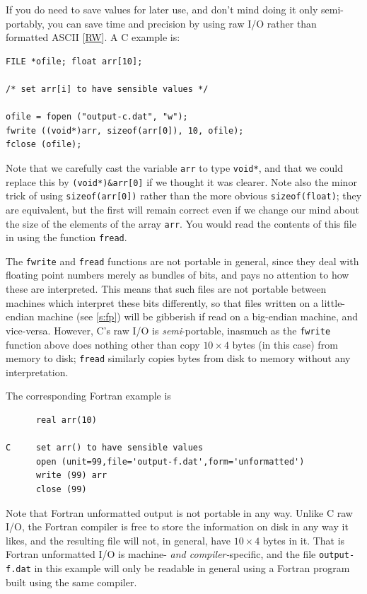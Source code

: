 \documentclass[11pt,oneside,chapters]{starlink}
\begin{document}
If you do need to save values for later use, and don't
mind doing it only semi-portably, you can save time and
precision by using raw I/O rather than formatted ASCII
[\hyperlink{ta:rw}{RW}].
A C example is:

\begin{verbatim}
FILE *ofile; float arr[10];

/* set arr[i] to have sensible values */

ofile = fopen ("output-c.dat", "w");
fwrite ((void*)arr, sizeof(arr[0]), 10, ofile);
fclose (ofile);
\end{verbatim}

Note that we carefully cast the variable
\texttt{arr} to type \texttt{void*}, and that we
could replace this by \texttt{(void*)\&arr[0]} if
we thought it was clearer.  Note also the minor trick of
using \texttt{sizeof(arr[0])} rather than the more
obvious \texttt{sizeof(float)}; they are equivalent,
but the first will remain correct even if we change our
mind about the size of the elements of the array
\texttt{arr}.  You would read the contents of this
file in using the function \texttt{fread}.

The \texttt{fwrite} and \texttt{fread}
functions are not portable in general, since they deal
with floating point numbers merely as bundles of bits,
and pays no attention to how these are interpreted.
This means that such files are not portable between
machines which interpret these bits differently, so that
files written on a little-endian machine (see \ref{s:fp})
will be gibberish if read on a big-endian
machine, and vice-versa.  However, C's raw I/O is
\emph{semi}-portable, inasmuch as the
\texttt{fwrite} function above does nothing other
than copy $10\times4$ bytes
(in this case) from memory to disk; \texttt{fread}
similarly copies bytes from disk to memory without any
interpretation.

The corresponding Fortran example is

\begin{verbatim}
      real arr(10)

C     set arr() to have sensible values
      open (unit=99,file='output-f.dat',form='unformatted')
      write (99) arr
      close (99)
\end{verbatim}

Note that Fortran unformatted output is not portable in
any way.  Unlike C raw I/O, the Fortran compiler is free
to store the information on disk in any way it likes,
and the resulting file will not, in general, have
$10\times4$ bytes in it.  That
is Fortran unformatted I/O is machine- \emph{and compiler-}specific,
and the file
\texttt{output-f.dat} in this example will only be
readable in general using a Fortran program built using
the same compiler.
\end{document}
